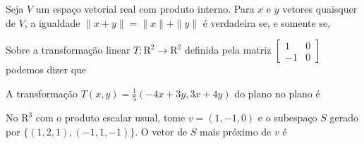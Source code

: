 {
\def\AMCbeginQuestion#1#2{\par\noindent{\bf (POSCOMP 2004 - Questão 02)}}
\begin{question}{} Seja $V$ um espaço vetorial real com produto interno. Para $x$ e $y$ vetores quaisquer de $V$, a igualdade $\|x+y\|=\|x\|+\|y\|$ é verdadeira se, e somente se,
\begin{choices}
\end{choices}
\end{question}
}
%
{
\def\AMCbeginQuestion#1#2{\par\noindent{\bf (POSCOMP 2004 - Questão 03)}}
\begin{question}{} Sobre a transformação linear $T:\mathrm{R}^{2}\to\mathrm{R}^{2}$ definida pela matriz $\left[\begin{array}{rr}1&0\\-1&0\end{array}\right]$ podemos dizer que
\begin{choices}
\end{choices}
\end{question}
}
%
{
\def\AMCbeginQuestion#1#2{\par\noindent{\bf (POSCOMP 2004 - Questão 04)}}
\begin{question}{} A transformação $T(x,y)=\frac{1}{5}(-4x+3y,3x+4y)$ do plano no plano é
\begin{choices}
\end{choices}
\end{question}
}
%
{
\def\AMCbeginQuestion#1#2{\par\noindent{\bf (POSCOMP 2004 - Questão 05)}}
\begin{question}{} No $\mathrm{R}^{3}$ com o produto escalar usual, tome $v=(1,-1,0)$ e o subespaço $S$ gerado por $\{(1,2,1),(-1,1,-1)\}$. O vetor de $S$ mais próximo de $v$ é
\begin{choices}
\end{choices}
\end{question}
}
